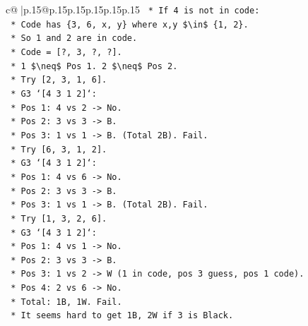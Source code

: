 \documentclass{article}
\begin{document}
{\begin{supertabular}{c@{$\;$}|p{.15\linewidth}@{}p{.15\linewidth}p{.15\linewidth}p{.15\linewidth}p{.15\linewidth}p{.15\linewidth}}
{{{\texttt{                    *   If 4 is not in code:} \\
\texttt{                        *   Code has \{3, 6, x, y\} where x,y \$\textbackslash{}in\$ \{1, 2\}.} \\
\texttt{                        *   So 1 and 2 are in code.} \\
\texttt{                        *   Code = {[}?, 3, ?, ?{]}.} \\
\texttt{                        *   1 \$\textbackslash{}neq\$ Pos 1. 2 \$\textbackslash{}neq\$ Pos 2.} \\
\texttt{                        *   Try {[}2, 3, 1, 6{]}.} \\
\texttt{                            *   G3 `{[}4 3 1 2{]}`:} \\
\texttt{                                *   Pos 1: 4 vs 2 {-}> No.} \\
\texttt{                                *   Pos 2: 3 vs 3 {-}> B.} \\
\texttt{                                *   Pos 3: 1 vs 1 {-}> B. (Total 2B). Fail.} \\
\texttt{                        *   Try {[}6, 3, 1, 2{]}.} \\
\texttt{                            *   G3 `{[}4 3 1 2{]}`:} \\
\texttt{                                *   Pos 1: 4 vs 6 {-}> No.} \\
\texttt{                                *   Pos 2: 3 vs 3 {-}> B.} \\
\texttt{                                *   Pos 3: 1 vs 1 {-}> B. (Total 2B). Fail.} \\
\texttt{                        *   Try {[}1, 3, 2, 6{]}.} \\
\texttt{                            *   G3 `{[}4 3 1 2{]}`:} \\
\texttt{                                *   Pos 1: 4 vs 1 {-}> No.} \\
\texttt{                                *   Pos 2: 3 vs 3 {-}> B.} \\
\texttt{                                *   Pos 3: 1 vs 2 {-}> W (1 in code, pos 3 guess, pos 1 code).} \\
\texttt{                                *   Pos 4: 2 vs 6 {-}> No.} \\
\texttt{                                *   Total: 1B, 1W. Fail.} \\
\texttt{                *   It seems hard to get 1B, 2W if 3 is Black.} \\
}}}
\end{supertabular}}
\end{document}
